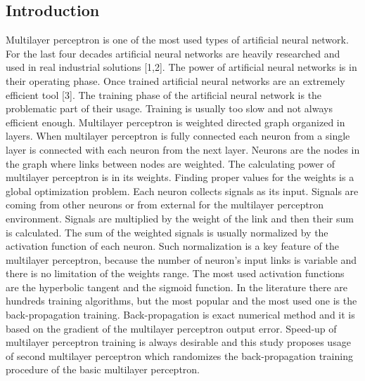 \documentclass[a0,portrait,25pt]{sciposter}
\begin{document}
\begin{mdframed}[backgroundcolor=white,roundcorner=4pt,shadow=true,linewidth=1pt]
\color{Black}
\section*{Introduction}
Multilayer perceptron is one of the most used types of artificial neural network. For the last four decades artificial neural networks are heavily researched and used in real industrial solutions [1,2]. The power of artificial neural networks is in their operating phase. Once trained artificial neural networks are an extremely efficient tool [3]. The training phase of the artificial neural network is the problematic part of their usage. Training is usually too slow and not always efficient enough. Multilayer perceptron is weighted directed graph organized in layers. When multilayer perceptron is fully connected each neuron from a single layer is connected with each neuron from the next layer. Neurons are the nodes in the graph where links between nodes are weighted. The calculating power of multilayer perceptron is in its weights. Finding proper values for the weights is a global optimization problem. Each neuron collects signals as its input. Signals are coming from other neurons or from external for the multilayer perceptron environment. Signals are multiplied by the weight of the link and then their sum is calculated. The sum of the weighted signals is usually normalized by the activation function of each neuron. Such normalization is a key feature of the multilayer perceptron, because the number of neuron's input links is variable and there is no limitation of the weights range. The most used activation functions are the hyperbolic tangent and the sigmoid function.  In the literature there are hundreds training algorithms, but the most popular and the most used one is the back-propagation training. Back-propagation is exact numerical method and it is based on the gradient of the multilayer perceptron output error. Speed-up of multilayer perceptron training is always desirable and this study proposes usage of second multilayer perceptron which randomizes the back-propagation training procedure of the basic multilayer perceptron. 
\end{mdframed}
\end{document}

